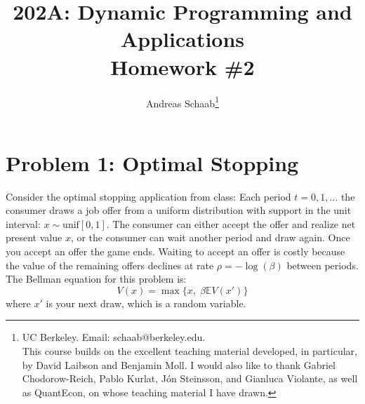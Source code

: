 \documentclass[11pt]{extarticle}
\title{202A: Dynamic Programming and Applications\\[5pt] {\Large \textbf{Homework \#2}}}
\author{Andreas Schaab\footnote{
	UC Berkeley. Email: schaab@berkeley.edu.\\
	This course builds on the excellent teaching material developed, in particular, by David Laibson and Benjamin Moll. I would also like to thank Gabriel Chodorow-Reich, Pablo Kurlat, J\'on Steinsson, and Gianluca Violante, as well as QuantEcon, on whose teaching material I have drawn. 
}}
\date{}
\theoremstyle{plain}
\theoremstyle{definition}
\begin{document}
\maketitle





\vspace{5mm}
\section*{Problem 1: Optimal Stopping}

Consider the optimal stopping application from class: Each period $t = 0, 1, \ldots$ the consumer draws a job offer from a uniform distribution with support in the unit interval: $x \sim \text{unif}[0, 1]$. The consumer can either accept the offer and realize net present value $x$, or the consumer can wait another period and draw again. Once you accept an offer the game ends. Waiting to accept an offer is costly because the value of the remaining offers declines at rate $\rho = - \log(\beta)$ between periods. The Bellman equation for this problem is:
\begin{equation*}
	V(x) = \max \bigg\{ x, \; \beta \mathbb E V(x') \bigg\}
\end{equation*}
where $x'$ is your next draw, which is a random variable.
\end{document}
